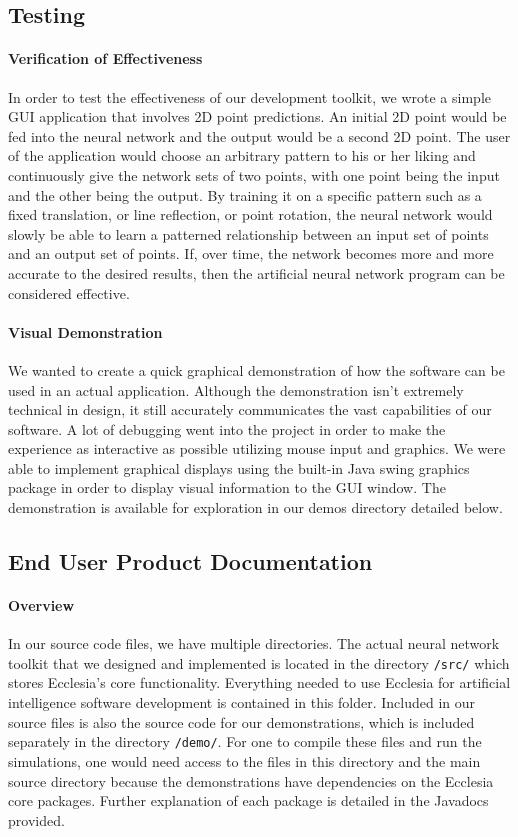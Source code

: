 \documentclass[letterpaper, 10pt]{article}
\begin{document}
	\subsection{Testing}
		\paragraph{Verification of Effectiveness}
		In order to test the effectiveness of our development toolkit, we wrote a simple GUI application that involves 2D point predictions. An initial 2D point would be fed into the neural network and the output would be a second 2D point. The user of the application would choose an arbitrary pattern to his or her liking and continuously give the network sets of two points, with one point being the input and the other being the output. By training it on a specific pattern such as a fixed translation, or line reflection, or point rotation, the neural network would slowly be able to learn a patterned relationship between an input set of points and an output set of points. If, over time, the network becomes more and more accurate to the desired results, then the artificial neural network program can be considered effective.
		\paragraph{Visual Demonstration} We wanted to create a quick graphical demonstration of how the software can be used in an actual application. Although the demonstration isn't extremely technical in design, it still accurately communicates the vast capabilities of our software. A lot of debugging went into the project in order to make the experience as interactive as possible utilizing mouse input and graphics. We were able to implement graphical displays using the built-in Java swing graphics package in order to display visual information to the GUI window. The demonstration is available for exploration in our demos directory detailed below.
	
	\subsection{End User Product Documentation}
		\paragraph{Overview}
		In our source code files, we have multiple directories. The actual neural network toolkit that we designed and implemented is located in the directory \texttt{/src/} which stores Ecclesia's core functionality. Everything needed to use Ecclesia for artificial intelligence software development is contained in this folder. Included in our source files is also the source code for our demonstrations, which is included separately in the directory \texttt{/demo/}. For one to compile these files and run the simulations, one would need access to the files in this directory and the main source directory because the demonstrations have dependencies on the Ecclesia core packages. Further explanation of each package is detailed in the Javadocs provided.
\end{document}
